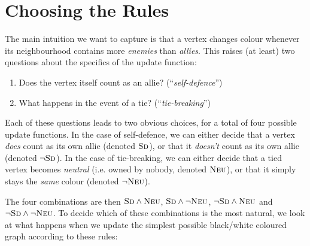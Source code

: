 \documentclass{article}
\begin{document}
\section{Choosing the Rules}

\newcommand{\selfDef}{\textsc{Sd}}
\newcommand{\nselfDef}{\neg \textsc{Sd}}
\newcommand{\tieNeu}{\textsc{Neu}}
\newcommand{\ntieNeu}{\neg \textsc{Neu}}

The main intuition we want to capture is that a vertex changes colour whenever its neighbourhood contains more \emph{enemies} than \emph{allies}. This raises (at least) two questions about the specifics of the update function:

\begin{enumerate}
  \item Does the vertex itself count as an allie? (``\emph{self-defence}'')
  \item What happens in the event of a tie? (``\emph{tie-breaking}'')
\end{enumerate}

Each of these questions leads to two obvious choices, for a total of four possible update functions. In the case of self-defence, we can either decide that a vertex \emph{does} count as its own allie (denoted $\selfDef$), or that it \emph{doesn't} count as its own allie (denoted $\nselfDef$). In the case of tie-breaking, we can either decide that a tied vertex becomes \emph{neutral} (i.e. owned by nobody, denoted $\tieNeu$), or that it simply stays the \emph{same} colour (denoted $\ntieNeu$).

The four combinations are then $\selfDef \wedge \tieNeu$, $\selfDef \wedge \ntieNeu$, $\nselfDef \wedge \tieNeu$ and $\nselfDef \wedge \ntieNeu$. To decide which of these combinations is the most natural, we look at what happens when we update the simplest possible black/white coloured graph according to these rules:

\begin{center}
\end{center}
\end{document}
